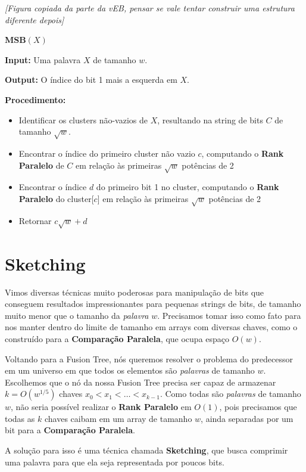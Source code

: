 \textit{[Figura copiada da parte da vEB, pensar se vale tentar construir uma estrutura diferente depois]}

\textbf{MSB}$(X)$

\textbf{Input:} Uma palavra $X$ de tamanho $w$.

\textbf{Output:} O índice do bit 1 mais a esquerda em $X$.

\textbf{Procedimento:}

\begin{itemize}
    \item Identificar os clusters não-vazios de $X$, resultando na
    string de bits $C$ de tamanho $\sqrt{w}$.
    \item Encontrar o índice do primeiro cluster não vazio $c$, computando o
    \textbf{Rank Paralelo} de $C$ em relação às primeiras $\sqrt{w}$ potências
    de 2
    \item Encontrar o índice $d$ do primeiro bit 1 no cluster, computando o
    \textbf{Rank Paralelo} do cluster[$c$] em relação às primeiras $\sqrt{w}$
    potências de 2
    \item Retornar $c\sqrt{w}+d$
\end{itemize}

\section{Sketching}

Vimos diversas técnicas muito poderosas para manipulação de bits que conseguem
resultados impressionantes para pequenas strings de bits, de tamanho muito menor
que o tamanho da \textit{palavra} $w$. Precisamos tomar isso como fato para nos
manter dentro do limite de tamanho em arrays com diversas chaves, como o
construído para a \textbf{Comparação Paralela}, que ocupa espaço $O(w)$. 

Voltando para a Fusion Tree, nós queremos resolver o problema do predecessor em
um universo em que todos os elementos são \textit{palavras} de tamanho $w$.
Escolhemos que o nó da nossa Fusion Tree precisa ser capaz de armazenar
$k=O(w^{1/5})$ chaves $x_0<x_1<\dots<x_{k-1}$. Como todas são \textit{palavras}
de tamanho $w$, não seria possível realizar o \textbf{Rank Paralelo} em $O(1)$,
pois precisamos que todas as $k$ chaves caibam em um array de tamanho $w$, ainda
separadas por um bit para a \textbf{Comparação Paralela}.

A solução para isso é uma técnica chamada \textbf{Sketching}, que busca
comprimir uma palavra para que ela seja representada por poucos bits.

